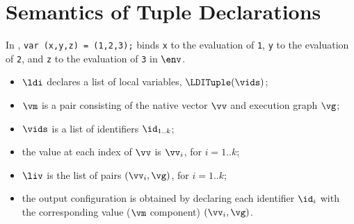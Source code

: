 \FormallyParagraph
\begin{mathpar}
\end{mathpar}

\section{Semantics of Tuple Declarations\label{sec:Semantics of Tuple Declarations}}
In ,
\texttt{var (x,y,z) = (1,2,3);} binds \texttt{x} to the evaluation of
\texttt{1}, \texttt{y} to the evaluation of \texttt{2}, and \texttt{z} to the
evaluation of \texttt{3} in $\env$.

\ProseParagraph
\AllApply
\begin{itemize}
  \item $\ldi$ declares a list of local variables, $\LDITuple(\vids)$;
  \item $\vm$ is a pair consisting of the native vector $\vv$ and execution graph $\vg$;
  \item $\vids$ is a list of identifiers $\id_{1..k}$;
  \item the value at each index of $\vv$ is $\vv_i$, for $i=1..k$;
  \item $\liv$ is the list of pairs $(\vv_i, \vg)$, for $i=1..k$;
  \item the output configuration is obtained by declaring each identifier $\id_i$
  with the corresponding value ($\vm$ component) $(\vv_i, \vg)$.
\end{itemize}

